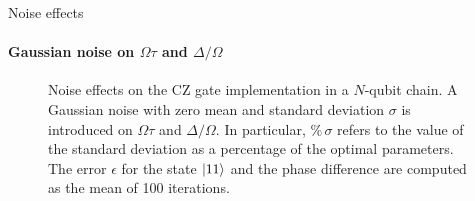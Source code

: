 \documentclass[8pt]{beamer}
\begin{document}
\begin{frame}[c]{Noise effects}
\framesubtitle{Gaussian noise on $\Omega \tau$ and  $\Delta/\Omega$}
\begin{figure}[H]
\begin{minipage}[c]{0.49\linewidth}
\end{minipage}
\begin{minipage}[]{0.49\linewidth}
\centering
{}
\end{minipage}
\caption{Noise effects on the CZ gate implementation in a $N$-qubit chain. A Gaussian noise with zero mean and standard deviation $\sigma$ is introduced on $\Omega\tau$ and $\Delta/\Omega$. In particular, $\% \, \sigma$ refers to the value of the standard deviation as a percentage of the optimal parameters. 
The error $\epsilon$ for the state $\left\vert{11}\right\rangle$ and the phase difference are computed as the mean of 100 iterations.}
\label{fig:chain_results}
\end{figure}
\end{frame}
\end{document}
